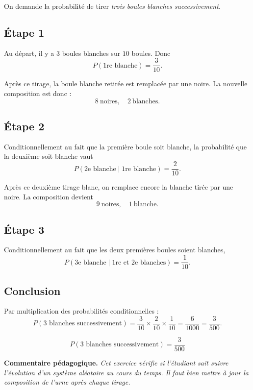 \documentclass[12pt,a4paper]{article}
\newenvironment{pedago}
{\par\smallskip\noindent\textbf{Commentaire pédagogique. }\itshape}
{\par\smallskip}
\begin{document}
On demande la probabilité de tirer \emph{trois boules blanches successivement}.

\subsection*{Étape 1}

Au départ, il y a $3$ boules blanches sur $10$ boules. Donc
\[
P(\text{1re blanche})=\frac{3}{10}.
\]

Après ce tirage, la boule blanche retirée est remplacée par une noire. La nouvelle composition est donc :
\[
8\ \text{noires},\quad 2\ \text{blanches}.
\]

\subsection*{Étape 2}

Conditionnellement au fait que la première boule soit blanche, la probabilité que la deuxième soit blanche vaut
\[
P(\text{2e blanche}\mid \text{1re blanche})=\frac{2}{10}.
\]

Après ce deuxième tirage blanc, on remplace encore la blanche tirée par une noire. La composition devient
\[
9\ \text{noires},\quad 1\ \text{blanche}.
\]

\subsection*{Étape 3}

Conditionnellement au fait que les deux premières boules soient blanches,
\[
P(\text{3e blanche}\mid \text{1re et 2e blanches})=\frac{1}{10}.
\]

\subsection*{Conclusion}

Par multiplication des probabilités conditionnelles :
\[
P(\text{3 blanches successivement})
=
\frac{3}{10}\times \frac{2}{10}\times \frac{1}{10}
=
\frac{6}{1000}
=
\frac{3}{500}.
\]

\[
\boxed{P(\text{3 blanches successivement})=\frac{3}{500}}
\]

\begin{pedago}
Cet exercice vérifie si l'étudiant sait suivre l'évolution d'un système aléatoire au cours du temps. Il faut bien mettre à jour la composition de l'urne après chaque tirage.
\end{pedago}
\end{document}
